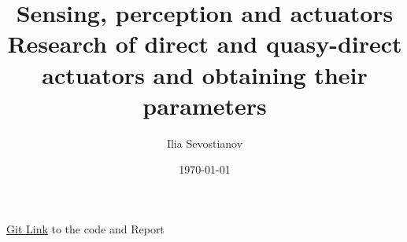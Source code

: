 \documentclass[12pt, a4paper]{report}
\title{%
  Sensing, perception and actuators \\
  \large  Research of direct and quasy-direct actuators
and obtaining their parameters}
\author{Ilia Sevostianov %
    }
\date{\today}
\begin{document}
\href{https://github.com/Terminateit/DynamicsHA5.git}{Git Link} to the code and Report
\end{document}
